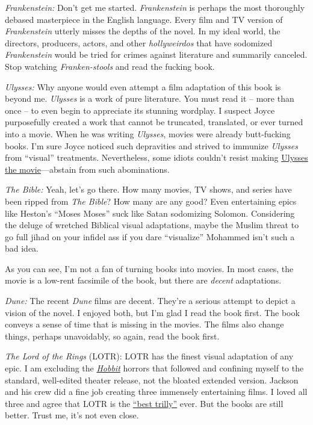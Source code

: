 \emph{Frankenstein:} Don't get me started. \emph{Frankenstein} is
perhaps the most thoroughly debased masterpiece in the English language.
Every film and TV version of \emph{Frankenstein} utterly misses the
depths of the novel. In my ideal world, the directors, producers,
actors, and other \emph{hollyweirdos} that have sodomized
\emph{Frankenstein} would be tried for crimes against literature and
summarily canceled. Stop watching \emph{Franken-stools} and read the
fucking book.

\emph{Ulysses:} Why anyone would even attempt a film adaptation of this
book is beyond me. \emph{Ulysses} is a work of pure literature. You must
read it -- more than once -- to even begin to appreciate its stunning
wordplay. I suspect Joyce purposefully created a work that cannot be
truncated, translated, or ever turned into a movie. When he was writing
\emph{Ulysses}, movies were already butt-fucking books. I'm sure Joyce
noticed such depravities and strived to immunize \emph{Ulysses} from
``visual'' treatments. Nevertheless, some idiots couldn't resist making
\href{https://en.wikipedia.org/wiki/Ulysses_(1967_film)}{Ulysses the movie}---abstain from such abominations.

\emph{The Bible:} Yeah, let's go there. How many movies, TV shows, and
series have been ripped from \emph{The Bible}? How many are any good?
Even entertaining epics like Heston's ``Moses Moses'' suck like Satan
sodomizing Solomon. Considering the deluge of wretched Biblical visual
adaptations, maybe the Muslim threat to go full jihad on your infidel ass
if you dare ``visualize'' Mohammed isn't such a bad idea.

As you can see, I'm not a fan of turning books into movies. In most
cases, the movie is a low-rent facsimile of the book, but there are
\emph{decent} adaptations.

\emph{Dune:} The recent \emph{Dune} films are decent. They're a serious
attempt to depict a vision of the novel. I enjoyed both, but I'm glad I
read the book first. The book conveys a sense of time that is missing in the
movies. The films also change things, perhaps unavoidably, so again,
read the book first.

\emph{The Lord of the Rings} (LOTR): LOTR has the finest visual
adaptation of any epic. I am excluding the \href{https://analyzethedatanotthedrivel.org/2012/12/16/king-hobbit-kong/}{\emph{Hobbit}} horrors that followed
and confining myself to the standard, well-edited theater release, not
the bloated extended version. Jackson and his crew did a fine job
creating three immensely entertaining films. I loved all three and agree
that LOTR is the \href{https://www.nerdsandbeyond.com/2021/12/16/stephen-colbert-friends-crown-the-lord-of-the-rings-as-the-1-trilly/}{``best trilly''} ever. But the books are still better. Trust me, it's not even
close.

